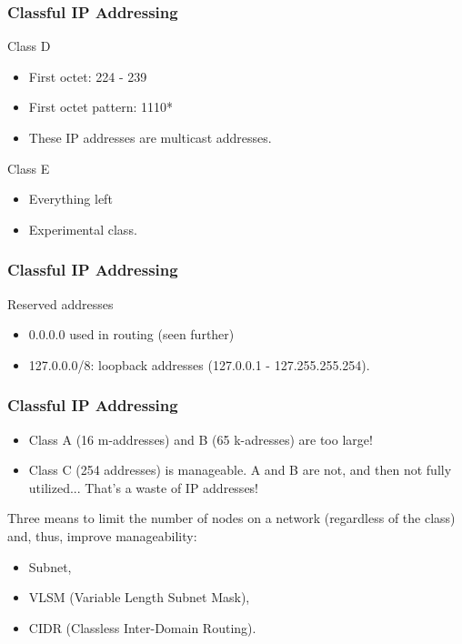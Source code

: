   \begin{frame}
    \frametitle{Classful IP Addressing}
    \begin{block}{Class D}
      \begin{itemize}
	\item First octet: {\color{ForestGreen}224} - {\color{ForestGreen}239}
	\item First octet pattern: {\color{ForestGreen}1110*}
	\item These IP addresses are multicast addresses.
      \end{itemize}
    \end{block}
    \begin{block}{Class E}
      \begin{itemize}
	\item Everything left
	\item Experimental class.
      \end{itemize}
    \end{block}
  \end{frame}

  \begin{frame}
    \frametitle{Classful IP Addressing}
    \begin{block}{Reserved addresses}
      \begin{itemize}
	\item 0.0.0.0 used in routing (seen further)
	\item {\color{ForestGreen}127}.{\color{blue}0.0.0}{\color{brown}/8}: loopback addresses ({\color{ForestGreen}127}.{\color{blue}0.0.1} - {\color{ForestGreen}127}.{\color{blue}255.255.254}).
      \end{itemize}
    \end{block}
  \end{frame}

  \begin{frame}
    \frametitle{Classful IP Addressing}
    \begin{itemize}
      \item Class A (16 m-addresses) and B (65 k-adresses) are too large!
      \item Class C (254 addresses) is manageable. A and B are not, and then not fully utilized... That's a waste of IP addresses!
    \end{itemize}
    Three means to limit the number of nodes on a network (regardless of the class) and, thus, improve manageability:
    \begin{itemize}
      \item Subnet,
      \item VLSM (Variable Length Subnet Mask),
      \item CIDR (Classless Inter-Domain Routing).
    \end{itemize}
  \end{frame}

